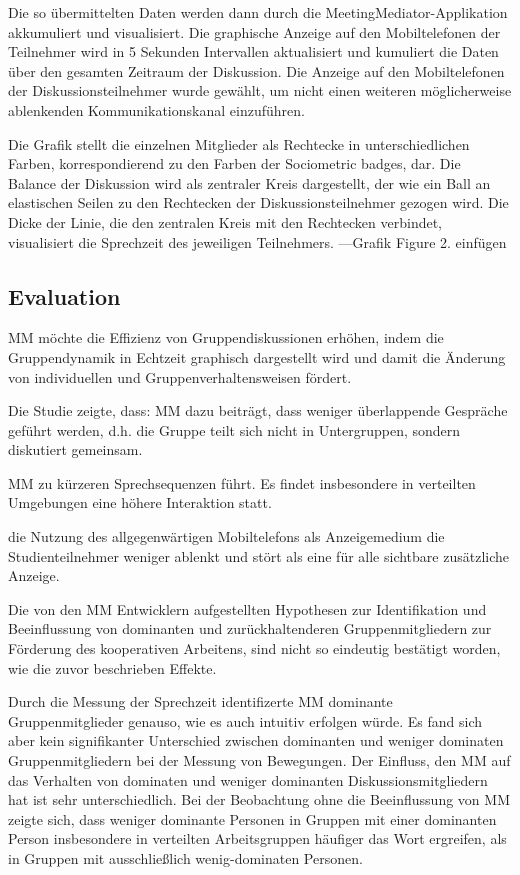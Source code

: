 Die so übermittelten Daten werden dann durch die
MeetingMediator-Applikation akkumuliert und visualisiert.
Die graphische Anzeige auf den Mobiltelefonen der Teilnehmer wird in 5 Sekunden
Intervallen aktualisiert und kumuliert die Daten über den gesamten Zeitraum der Diskussion.
Die Anzeige auf den Mobiltelefonen der Diskussionsteilnehmer wurde gewählt, um
nicht einen weiteren möglicherweise ablenkenden Kommunikationskanal einzuführen.

Die Grafik stellt die einzelnen Mitglieder als Rechtecke in
unterschiedlichen Farben, korrespondierend zu den Farben der Sociometric badges,
dar. Die Balance der Diskussion wird als zentraler Kreis dargestellt, der wie
ein Ball an elastischen Seilen zu den Rechtecken der Diskussionsteilnehmer
gezogen wird. Die Dicke der Linie, die den zentralen Kreis mit den Rechtecken
verbindet, visualisiert die Sprechzeit des jeweiligen Teilnehmers. 
---Grafik Figure 2. einfügen

\subsection{Evaluation}
MM möchte die Effizienz von Gruppendiskussionen erhöhen, indem die
Gruppendynamik in Echtzeit graphisch dargestellt wird und damit die Änderung von 
 individuellen und Gruppenverhaltensweisen fördert.
 
Die Studie zeigte, dass:
MM dazu beiträgt, dass weniger überlappende Gespräche geführt werden, d.h. die
Gruppe teilt sich nicht in Untergruppen, sondern diskutiert gemeinsam.

MM zu kürzeren Sprechsequenzen führt. Es findet insbesondere in verteilten
Umgebungen eine höhere Interaktion statt.

die Nutzung des allgegenwärtigen Mobiltelefons als Anzeigemedium die
Studienteilnehmer weniger ablenkt und stört als eine für alle sichtbare
zusätzliche Anzeige.

Die von den MM Entwicklern aufgestellten Hypothesen zur Identifikation und
Beeinflussung von dominanten und zurückhaltenderen Gruppenmitgliedern zur
Förderung des kooperativen Arbeitens, sind nicht so eindeutig bestätigt worden,
wie die zuvor beschrieben Effekte.

Durch die Messung der Sprechzeit identifizerte MM dominante Gruppenmitglieder
genauso, wie es auch intuitiv erfolgen würde. Es fand sich aber kein
signifikanter Unterschied zwischen dominanten und weniger dominaten
Gruppenmitgliedern bei der Messung von Bewegungen.
Der Einfluss, den MM auf das Verhalten von dominaten und weniger dominanten
Diskussionsmitgliedern hat ist sehr unterschiedlich.
Bei der Beobachtung ohne die Beeinflussung von MM zeigte sich, dass weniger
dominante Personen in Gruppen mit einer dominanten Person insbesondere in
verteilten Arbeitsgruppen häufiger das Wort ergreifen, als in Gruppen mit
ausschließlich wenig-dominaten Personen.

